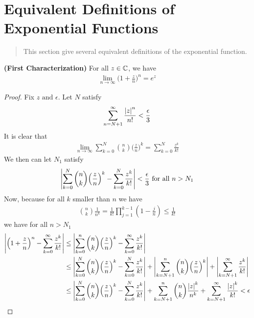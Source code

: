 \documentclass{report}
\begin{document}
\section{Equivalent Definitions of Exponential Functions}
\begin{abstract}
This section give several equivalent definitions of the exponential function. 
\end{abstract}
\begin{theorem}
\textbf{(First Characterization)} For all $z\in\mathbb{C}$, we have 
\begin{align*}
\lim_{n\to \infty}\Big(1+\frac{z}{n} \Big)^{n}=e^z
\end{align*}
\end{theorem}
\begin{proof}
Fix $z\text{ and }\epsilon $. Let $N$ satisfy 
\begin{align*}
\sum_{n=N+1}^{\infty} \frac{\left|z\right|^n}{n!}< \frac{\epsilon }{3}
\end{align*}
It is clear that  
\begin{align*}
\lim_{n\to \infty}\sum_{k=0}^N \binom{n}{k}\Big(\frac{z}{n}\Big)^k =\sum_{k=0}^N \frac{z^k}{k!}
\end{align*}
We then can let $N_1$ satisfy 
\begin{align*}
 \left|\sum_{k=0}^N \binom{n}{k} \Big( \frac{z}{n} \Big)^k - \sum_{k=0}^N \frac{z^k}{k!}\right|< \frac{\epsilon}{3}\text{ for all }n>N_1
\end{align*}
Now, because for all $k$ smaller than  $n$ we have
 \begin{align*}
\binom{n}{k}\frac{1}{n^k}= \frac{1}{k!}\prod_{j=1}^{k-1} (1-\frac{j}{n})\leq \frac{1}{k!}
\end{align*}
we have for all $n>N_1$ 
\begin{align*}
  \left|\Big( 1+\frac{z}{n} \Big)^n - \sum_{k=0}^{\infty} \frac{z^k}{k!}\right|&\leq \left|\sum_{k=0}^n \binom{n}{k}\Big(\frac{z}{n} \Big)^k - \sum_{k=0}^{\infty} \frac{z^k}{k!}\right|\\
                                                                                   &\leq \left|\sum_{k=0}^{N}\binom{n}{k}\Big(\frac{z}{n} \Big)^k - \sum_{k=0}^N \frac{z^k}{k!}\right|+ \left|\sum_{k=N+1}^{n} \binom{n}{k} \Big(\frac{z}{n} \Big)^k \right|+ \left|\sum_{k=N+1}^{\infty}  \frac{z^k}{k!}\right|\\
                                                                                   &\leq \left|\sum_{k=0}^{N}\binom{n}{k}\Big(\frac{z}{n} \Big)^k - \sum_{k=0}^N \frac{z^k}{k!}\right|+ \sum_{k=N+1}^{n} \binom{n}{k} \frac{\left|z\right|^k}{n^k}  + \sum_{k=N+1}^{\infty}  \frac{\left|z\right|^k}{k!}< \epsilon 
\end{align*}
\end{proof}
\end{document}
